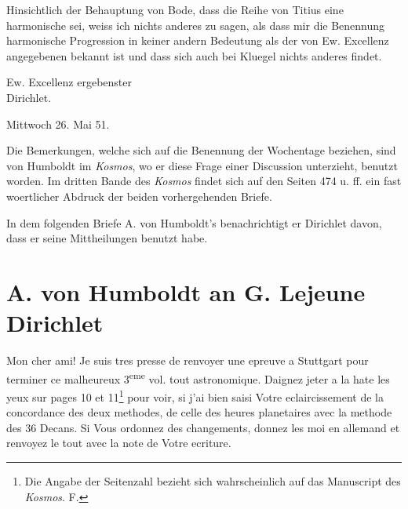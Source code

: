 \documentclass[11pt]{article}
\newcommand{\sign}[1]{\begin{flushright}#1\end{flushright}}
\begin{document}
Hinsichtlich der Behauptung von Bode, dass die Reihe von Titius eine harmonische sei, weiss ich nichts anderes zu sagen, als dass mir die Benennung harmonische Progression in keiner andern Bedeutung als der von Ew. Excellenz angegebenen bekannt ist und dass sich auch bei Kluegel nichts anderes findet.
\sign{Ew. Excellenz ergebenster\\ Dirichlet.}
Mittwoch 26. Mai 51.

Die Bemerkungen, welche sich auf die Benennung der Wochentage beziehen, sind von Humboldt im \emph{Kosmos}, wo er diese Frage einer Discussion unterzieht, benutzt worden. Im dritten Bande des \emph{Kosmos} findet sich auf den Seiten 474 u. ff. ein fast woertlicher Abdruck der beiden vorhergehenden Briefe.

In dem folgenden Briefe A. von Humboldt's benachrichtigt er Dirichlet davon, dass er seine Mittheilungen benutzt habe.

\section*{A. von Humboldt an G. Lejeune Dirichlet}
Mon cher ami! Je suis tres presse de renvoyer une epreuve a Stuttgart pour terminer ce malheureux 3\textsuperscript{eme} vol. tout astronomique. Daignez jeter a la hate les yeux sur pages 10 et 11\footnote{Die Angabe der Seitenzahl bezieht sich wahrscheinlich auf das Manuscript des \emph{Kosmos}. F.} pour voir, si j'ai bien saisi Votre eclaircissement de la concordance des deux methodes, de celle des heures planetaires avec la methode des 36 Decans. Si Vous ordonnez des changements, donnez les moi en allemand et renvoyez le tout avec la note de Votre ecriture.
\end{document}
